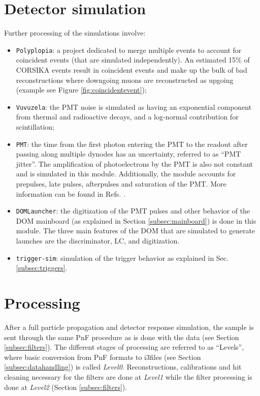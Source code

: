 \section{Detector simulation}
Further processing of the simulations involve:
\vspace{2mm}
\begin{itemize}
\item \texttt{Polyplopia}: a project dedicated to merge multiple events to account for coincident events (that are simulated independently). An estimated 15\% of CORSIKA events result in coincident events and make up the bulk of bad reconstructions where downgoing muons are reconstructed as upgoing (example see Figure \ref{fig:coincidentevent});
\item \texttt{Vuvuzela}: the PMT noise is simulated as having an exponential component from  thermal and radioactive decays, and a log-normal contribution for scintillation;
\item \texttt{PMT}: the time from the first photon entering the PMT to the readout after passing along multiple dynodes has an uncertainty, referred to as ``PMT jitter''. The amplification of photoelectrons by the PMT is also not constant and is simulated in this module. Additionally, the module accounts for prepulses, late pulses, afterpulses and saturation of the PMT. More information can be found in Refs. \cite{Abbasi:2010vc,Ma:2009aw}.
\item \texttt{DOMLauncher}: the digitization of the PMT pulses and other behavior of the DOM mainboard (as explained in Section \ref{subsec:mainboard}) is done in this module. The three main features of the DOM that are simulated to generate launches are the discriminator, LC, and digitization.
\item \texttt{trigger-sim}: simulation of the trigger behavior as explained in Sec. \ref{subsec:triggers}.
\end{itemize}

\section{Processing}
\label{sec:processing}
After a full particle propagation and detector response simulation, the sample is sent through the same PnF procedure as is done with the data (see Section \ref{subsec:filters}). The different stages of processing are referred to as ``Levels'', where basic conversion from PnF formats to i3files (see Section \ref{subsec:datahandling}) is called \textit{Level0}. Reconstructions, calibrations and hit cleaning necessary for the filters are done at \textit{Level1} while the filter processing is done at \textit{Level2} (Section \ref{subsec:filters}).

